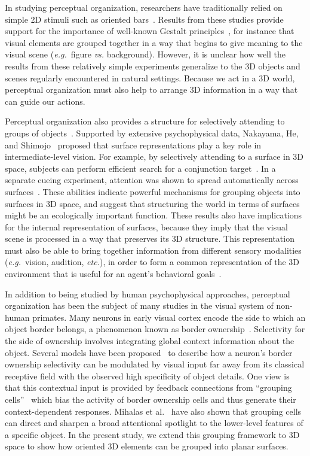 \documentclass[conference]{IEEEtran}
\newcommand{\eg}[0]{{\em e.g.}\ }
\newcommand{\etc}[0]{{\em etc.}\xspace}
\newcommand{\vs}[0]{{\em vs.}\xspace}
\begin{document}
In studying perceptual organization, researchers have traditionally
relied on simple 2D stimuli such as oriented
bars~\cite{Palmer_02}. Results from these studies provide support for
the importance of well-known Gestalt principles~\cite{Koffka35,
  Wertheimer23}, for instance 
that visual elements are grouped together in a way that
begins to give meaning to the visual scene (\eg figure
\vs background). However, it is unclear how well the results from
these relatively simple experiments generalize to the 3D objects and
scenes regularly encountered in natural settings. Because we act in a
3D world, perceptual organization must also help to arrange 3D
information in a way that can guide our actions. 

Perceptual organization also provides a structure for selectively
attending to groups of objects~\cite{Treisman_Gelade80}. Supported by
extensive psychophysical data, Nakayama, He, and
Shimojo~\cite{Nakayama_etal95} proposed that surface representations
play a key role in intermediate-level vision. For example, by
selectively attending to a surface in 3D space, subjects can perform
efficient search for a conjunction
target~\cite{Nakayama_Silverman86}. In a separate cueing experiment,
attention was shown to spread automatically across
surfaces~\cite{He_Nakayama95}. These abilities indicate powerful
mechanisms for grouping objects into surfaces in 3D space, and suggest
that structuring the world in terms of surfaces might be an
ecologically important function. These results also have implications
for the internal representation of surfaces, because they imply that
the visual scene is processed in a way that preserves its 3D
structure. This representation must also be able to bring together
information from different sensory modalities (\eg vision, audition,
\etc), in order to form a common representation of the 3D environment
that is useful for an agent's behavioral goals~\cite{Lewicki_etal14}.

In addition to being studied by human psychophysical approaches,
perceptual organization has been the subject of many studies in the
visual system of non-human primates. Many neurons in early visual cortex encode the side to which an object
border belongs, a phenomenon known as border
ownership~\cite{Zhou_etal00}. Selectivity for the side of ownership
involves integrating global context information about the
object. Several models have been proposed~\cite{Zhaoping05,
  Craft_etal07} to describe how a neuron's border ownership
selectivity can be modulated by visual input far away from its
classical receptive field with the observed high specificity of object details. %
One
view is that this contextual input is provided by feedback connections
from ``grouping cells''~\cite{Craft_etal07} which bias the activity of
border ownership cells and thus generate their context-dependent
responses. Mihalas et al.~\cite{Mihalas_etal11b} have also shown that
grouping cells can direct and sharpen a broad attentional spotlight to
the lower-level features of a specific object. In the present study,
we extend this grouping framework to 3D space to show how oriented 3D
elements can be grouped into planar surfaces.
\end{document}
